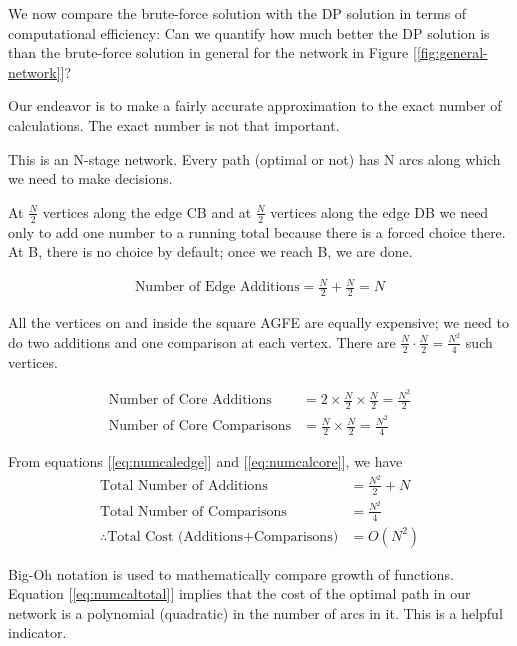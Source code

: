 \documentclass[english,notitlepage,smartquotes]{hgbreport}
\theoremstyle{definition}
\theoremstyle{definition}
\theoremstyle{remark}
\theoremstyle{definition}
\theoremstyle{plain}
\theoremstyle{definition}
\begin{document}
We now compare the brute-force solution with the DP solution in terms of computational efficiency: Can we quantify how much better the DP solution is than the brute-force solution in general for the network in Figure [\ref{fig:general-network}]?

Our endeavor is to make a fairly accurate approximation to the exact number of calculations. The exact number is not that important.

This is an N-stage network. Every path (optimal or not) has N arcs along which we need to make decisions. 

At $\frac{N}{2}$ vertices along the edge CB and at $\frac{N}{2}$ vertices along the edge DB we need only to add one number to a running total because there is a forced choice there. At B, there is no choice by default; once we reach B, we are done.

\begin{equation}
\begin{aligned}
\text{Number of Edge Additions}=\frac{N}{2}+\frac{N}{2}=N
\end{aligned}
\label{eq:numcaledge}
\end{equation}

All the vertices on and inside the square AGFE are equally expensive; we need to do two additions and one comparison at each vertex. There are $\frac{N}{2}\cdot\frac{N}{2}=\frac{N^2}{4}$ such vertices.

\begin{equation}
\begin{aligned}
\text{Number of Core Additions}&=2\times\frac{N}{2}\times\frac{N}{2}=\frac{N^2}{2}\\
\text{Number of Core Comparisons}&=\frac{N}{2}\times\frac{N}{2}=\frac{N^2}{4}
\end{aligned}
\label{eq:numcalcore}
\end{equation}

From equations [\ref{eq:numcaledge}] and [\ref{eq:numcalcore}], we have 
\begin{equation}
\begin{aligned}
\text{Total Number of Additions}&=\frac{N^2}{2}+N\\
\text{Total Number of Comparisons}&=\frac{N^2}{4}\\
\therefore \text{Total Cost (Additions+Comparisons)}&=O(N^2)
\end{aligned}
\label{eq:numcaltotal}
\end{equation}

Big-Oh notation is used to mathematically compare growth of functions. Equation [\ref{eq:numcaltotal}] implies that the cost of the optimal path in our network is a polynomial (quadratic) in the number of arcs in it. This is a helpful indicator.
\end{document}
